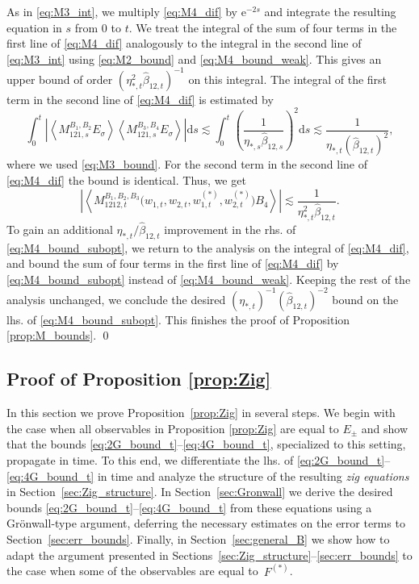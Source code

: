 \documentclass[10pt]{amsart}
\numberwithin{equation}{section}
\newcommand{\dif}{\mathrm{d}}
\newcommand{\ee}{\mathrm{e}}
\begin{document}
As in \eqref{eq:M3_int}, we multiply \eqref{eq:M4_dif} by $\ee^{-2s}$ and integrate the resulting equation in $s$ from 0 to $t$. We treat the integral of the sum of four terms in the first line of \eqref{eq:M4_dif} analogously to the integral in the second line of \eqref{eq:M3_int} using \eqref{eq:M2_bound} and \eqref{eq:M4_bound_weak}. This gives an upper bound of order $(\eta_{*,t}^2\widehat{\beta}_{12,t})^{-1}$ on this integral. The integral of the first term in the second line of \eqref{eq:M4_dif} is estimated by
\begin{equation}
\int_0^t \left\vert \left\langle M_{121,s}^{B_1,B_2}E_\sigma\right\rangle \left\langle M_{121,s}^{B_3,B_4}E_\sigma\right\rangle\right\vert\dif s\lesssim \int_0^t \left(\frac{1}{\eta_{*,s}\widehat{\beta}_{12,s}}\right)^2\dif s\lesssim\frac{1}{\eta_{*,t}(\widehat{\beta}_{12,t})^2},
\end{equation}
where we used \eqref{eq:M3_bound}. For the second term in the second line of \eqref{eq:M4_dif} the bound is identical. Thus, we get 
\begin{equation}
\left\vert\left\langle M_{1212,t}^{B_1,B_2,B_3}\big(w_{1,t},w_{2,t},w_{1,t}^{(*)},w_{2,t}^{(*)}\big)B_4\right\rangle\right\vert\lesssim \frac{1}{\eta_{*,t}^2\widehat{\beta}_{12,t}}.\label{eq:M4_bound_subopt}
\end{equation}
To gain an additional $\eta_{*,t}/\widehat{\beta}_{12,t}$ improvement in the rhs. of \eqref{eq:M4_bound_subopt}, we return to the analysis on the integral of \eqref{eq:M4_dif}, and bound the sum of four terms in the first line of \eqref{eq:M4_dif} by \eqref{eq:M4_bound_subopt} instead of \eqref{eq:M4_bound_weak}. Keeping the rest of the analysis unchanged, we conclude the desired $(\eta_{*,t})^{-1}(\widehat{\beta}_{12,t})^{-2}$ bound on the lhs. of \eqref{eq:M4_bound_subopt}. This finishes the proof of Proposition \ref{prop:M_bounds}. \qed


\subsection{Proof of Proposition \ref{prop:Zig}}\label{sec:Zig_old} In this section we prove Proposition~\ref{prop:Zig} in several steps. We begin with the case when all observables in Proposition \ref{prop:Zig} are equal to $E_\pm$ and show that the bounds \eqref{eq:2G_bound_t}--\eqref{eq:4G_bound_t}, specialized to this setting, propagate in time. To this end, we differentiate the lhs. of \eqref{eq:2G_bound_t}--\eqref{eq:4G_bound_t} in time and analyze the structure of the resulting \emph{zig equations} in Section~\ref{sec:Zig_structure}. In Section~\ref{sec:Gronwall} we derive the desired bounds \eqref{eq:2G_bound_t}--\eqref{eq:4G_bound_t} from these equations using a Gr{\"o}nwall-type argument, deferring the necessary estimates on the error terms to Section~\ref{sec:err_bounds}. Finally, in Section~\ref{sec:general_B} we show how to adapt the argument presented in Sections~\ref{sec:Zig_structure}--\ref{sec:err_bounds} to the case when some of the observables are equal to~$F^{(*)}$.
\end{document}
